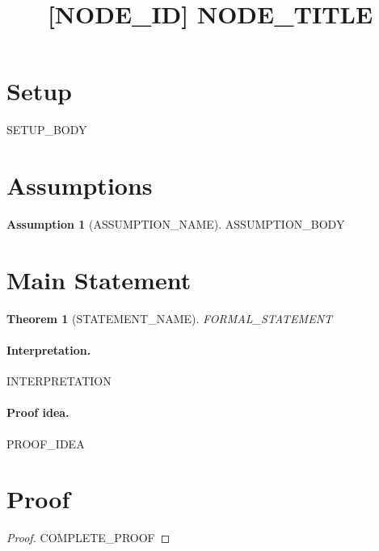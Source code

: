 \documentclass[11pt]{article}
\title{[{{NODE_ID}}] {{NODE_TITLE}}}
\author{}
\date{}
\newtheorem{theorem}{Theorem}
\theoremstyle{definition}
\newtheorem{assumption}{Assumption}
\begin{document}
\maketitle

\section*{Setup}
{{SETUP_BODY}}

\section*{Assumptions}
\begin{assumption}[{{ASSUMPTION_NAME}}]\label{ass:{{NODE_ID}}-1}
{{ASSUMPTION_BODY}}
\end{assumption}

\section*{Main Statement}
\begin{theorem}[{{STATEMENT_NAME}}]\label{stmt:{{NODE_ID}}}
{{FORMAL_STATEMENT}}
\end{theorem}

\paragraph{Interpretation.}
{{INTERPRETATION}}

\paragraph{Proof idea.}
{{PROOF_IDEA}}

\section*{Proof}
\begin{proof}
{{COMPLETE_PROOF}}
\end{proof}
\end{document}
